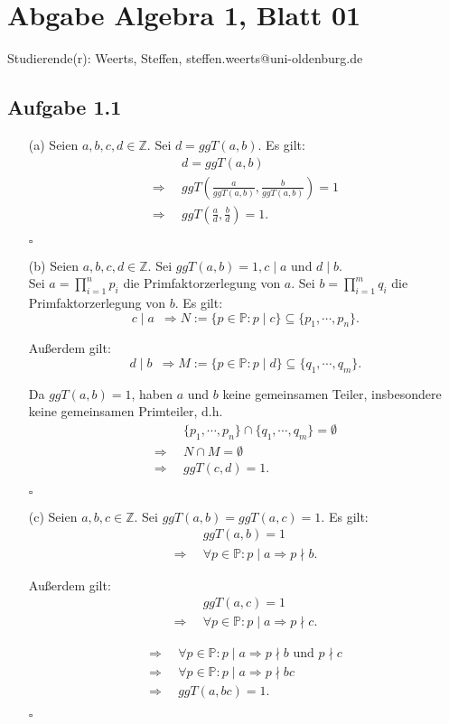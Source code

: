 \documentclass[12pt]{article}
\newcommand{\QED}{\begin{flushright} $\square$ \end{flushright}}
\newcommand{\df}{\Longrightarrow \enspace}
\begin{document}
\section*{Abgabe Algebra 1, Blatt 01}

Studierende(r): Weerts, Steffen, steffen.weerts@uni-oldenburg.de

\subsection*{Aufgabe 1.1}
\begin{enumerate}
\item[(a)] Seien $a, b, c, d \in \mathbb{Z}$. Sei $d=ggT(a,b)$. Es gilt:
\begin{align*}
    &d = ggT(a,b) \\
	\df &ggT(\frac{a}{ggT(a,b)},\frac{b}{ggT(a,b)}) = 1 \\
	\df &ggT(\frac{a}{d}, \frac{b}{d}) = 1.
\end{align*}
\QED

\item[(b)] Seien $a, b, c, d \in \mathbb{Z}$. Sei $ggT(a,b)=1, c \mid a$ und $d \mid b$. \\
Sei $a = \prod\limits_{i = 1}^{n}p_i$ die Primfaktorzerlegung von $a$. Sei $b = \prod\limits_{i = 1}^{m}q_i$ die Primfaktorzerlegung von $b$. Es gilt:
$$c \mid a \enspace \Longrightarrow N := \{p \in \mathbb{P} : p \mid c\} \subseteq \{p_1, \cdots, p_n\}.$$

Außerdem gilt:
$$d \mid b \enspace \Longrightarrow M := \{p \in \mathbb{P} : p \mid d\} \subseteq \{q_1, \cdots, q_m\}.$$

Da $ggT(a,b) = 1$, haben $a$ und $b$ keine gemeinsamen Teiler, insbesondere keine gemeinsamen Primteiler, d.h.
\begin{align*}
	&\{p_1, \cdots, p_n\} \cap \{q_1, \cdots, q_m\} = \emptyset \\
	\df &N \cap M = \emptyset \\
	\df &ggT(c, d) = 1.
\end{align*}
\QED

\item[(c)] Seien $a, b, c \in \mathbb{Z}$. Sei $ggT(a, b) = ggT(a, c) = 1$. Es gilt:
\begin{align*}
	&ggT(a, b) = 1 \\
	\df &\forall p \in \mathbb{P}: p \mid a \Rightarrow p \nmid b.
\end{align*}

Außerdem gilt:
\begin{align*}
	&ggT(a, c) = 1 \\
	\df &\forall p \in \mathbb{P}: p \mid a \Rightarrow p \nmid c.
\end{align*}

\begin{align*}
	\df &\forall p \in \mathbb{P}: p \mid a \Rightarrow p \nmid b \text{ und } p \nmid c \\
	\df &\forall p \in \mathbb{P}: p \mid a \Rightarrow p \nmid b c \\
	\df &ggT(a, b c) = 1.
\end{align*}
\QED

\end{enumerate}
\end{document}
